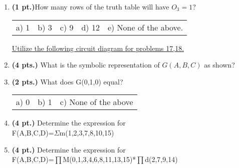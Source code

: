 \documentclass{article}
\begin{document}
\begin{enumerate}
\item {\bf (1 pt.)}How many rows of the truth table will have $O_3 = 1$?

\begin{tabular}{p{0.7in} p{0.7in} p{0.7in} p{0.7in} l}
a) 1 & b) 3 & c) 9 & d) 12 & e) None of the above.
\end{tabular}

\underline{Utilize the following circuit diagram for problems 17,18.}

\begin{figure}[ht]
\end{figure}

\item {\bf (4 pts.)} What is the symbolic representation of 
$G(A,B,C)$ as shown?  

\item {\bf (2 pts.)} What does G(0,1,0) equal?

\begin{tabular}{p{0.7in} p{0.7in} l}
a) 0 & b) 1 & c) None of the above
\end{tabular}

\pagebreak

\item {\bf (4 pt.)} Determine the \SOPmin expression for \\
F(A,B,C,D)=$\Sigma$m(1,2,3,7,8,10,15)


\item {\bf (4 pt.)} Determine the \POSmin expression for \\
F(A,B,C,D)=$\prod$M(0,1,3,4,6,8,11,13,15)*$\prod$d(2,7,9,14)


\end{enumerate}
\end{document}
